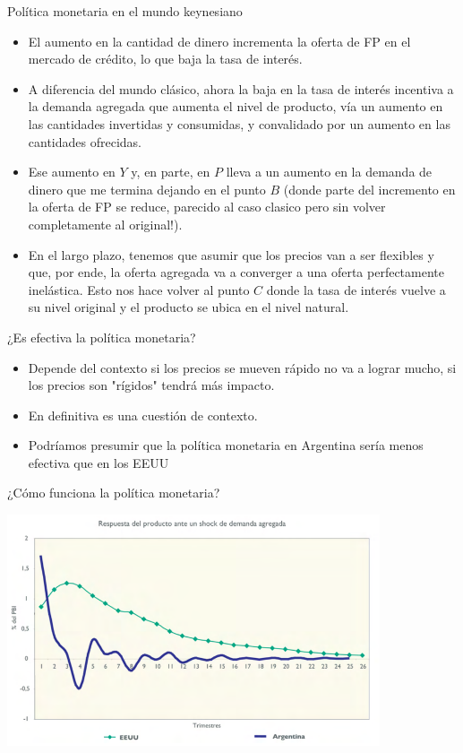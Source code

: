 \documentclass{beamer}
\begin{document}
\begin{frame}{Política monetaria en el mundo keynesiano}

\begin{itemize}
    \item El aumento en la cantidad de dinero incrementa la oferta de FP en el mercado de crédito, lo que baja la tasa de interés. 
    \item A diferencia del mundo clásico, ahora la baja en la tasa de interés incentiva a la demanda agregada que aumenta el nivel de producto, vía un aumento en las cantidades invertidas y consumidas, y convalidado por un aumento en las cantidades ofrecidas. 
    \item Ese aumento en $Y$ y, en parte, en $P$ lleva a un aumento en la demanda de dinero que me termina dejando en el punto $B$ (donde parte del incremento en la oferta de FP se reduce, parecido al caso clasico pero sin volver completamente al original!).
    \item En el largo plazo, tenemos que asumir que los precios van a ser flexibles y que, por ende, la oferta agregada va a converger a una oferta perfectamente inelástica. Esto nos hace volver al punto $C$ donde la tasa de interés vuelve a su nivel original y el producto se ubica en el nivel natural.
\end{itemize}
 

\end{frame}

\begin{frame}{¿Es efectiva la política monetaria?}

    \begin{itemize}
        \item Depende del contexto si los precios se mueven rápido no va a lograr mucho, si los precios son "rígidos" tendrá más impacto. 
        \item En definitiva es una cuestión de contexto.
        \item Podríamos presumir que la política monetaria en Argentina sería menos efectiva que en los EEUU

    \end{itemize}
    
\end{frame}

\begin{frame}{¿Cómo funciona la política monetaria?}
    
    \centering\includegraphics[width=11cm]{../Figures/C40.8.png}\

\end{frame}
\end{document}
